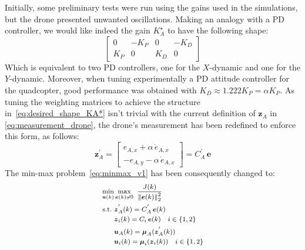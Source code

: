 \documentclass{ifacconf}
\begin{document}
Initially, some preliminary tests were run using the gains used in the simulations,
but the drone presented unwanted oscillations.
Making an analogy with a PD controller, we would like indeed the gain $K^\star_A$
to have the following shape:
\begin{equation}
    \begin{bmatrix}
        0  &  -K_P    &  0  &  -K_D \\
        K_P &     0       & K_D &      0
    \end{bmatrix}
    \label{eq:desired_shape_KA*}
\end{equation}
Which is equivalent to two PD controllers, one for 
the $X$-dynamic and one for the $Y$-dynamic.
Moreover, when tuning experimentally a PD attitude controller 
for the quadcopter, good  performance was obtained 
with $K_D \approx 1.222 K_P = \alpha K_P$.
As tuning the weighting matrices to achieve the structure 
in~\eqref{eq:desired_shape_KA*} isn't trivial with the current definition of 
$\boldsymbol{z}_A$ in \eqref{eq:measurement_drone}, 
the drone's measurement has been redefined to enforce this form, as follows:
\begin{equation}
    \boldsymbol{z}^{'}_A = \begin{bmatrix}
        e_{A,x} + \alpha \, \dot{e}_{A,x} \\ 
        - e_{A,y} - \alpha \, \dot{e}_{A,x}
    \end{bmatrix} = C^{'}_A \, \boldsymbol{e}
\end{equation}
The min-max problem~\eqref{eq:minmax_v1} has been consequently changed to:
\begin{equation}
    \footnotesize
\begin{aligned}
    \min_{\boldsymbol{u}(k)} & \max_{\boldsymbol{e}(k) \neq 0} \ \frac{
    J(k)}{\left\lVert \boldsymbol{e}(k)\right\rVert^2_2} \\
    \textrm{s.t.} \  &\boldsymbol{z}^{'}_A(k) = C^{'}_A \, \boldsymbol{e}(k) \\
    \quad &\boldsymbol{z}_i(k) = C_i \, \boldsymbol{e}(k) \quad i \in \{1,2\} \\
    \quad & \boldsymbol{u}_{A}(k) = \boldsymbol{\mu}_A(\boldsymbol{z}^{'}_A(k))\\
    \quad & \boldsymbol{u}_{i}(k) = \boldsymbol{\mu}_i(\boldsymbol{z}_i(k)) \quad i \in \{1,2\} \\
\end{aligned}
\label{eq:minmax_v2}
\end{equation}
\end{document}

